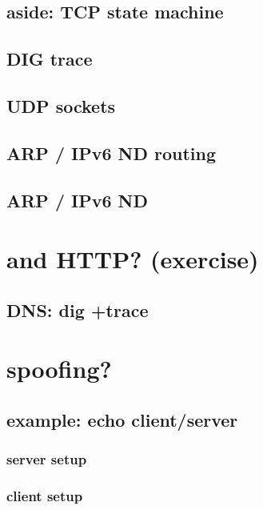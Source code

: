 \subsection{aside: TCP state machine}
\subsection{DIG trace}


\subsection{UDP sockets}


\subsection{ARP / IPv6 ND routing}


\subsection{ARP / IPv6 ND}


\section{and HTTP? (exercise)}


\subsection{DNS: dig +trace}


\section{spoofing?}



\subsection{example: echo client/server}
\subsubsection{server setup}

\subsubsection{client setup}


